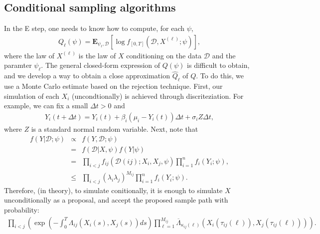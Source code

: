 \documentclass[12pt]{article}%
\begin{document}
\subsection{Conditional sampling algorithms}
In the E step, one needs to know how to compute, for each $\psi$,
\begin{eqnarray}
Q_\ell(\psi) = \mathbf E_{\psi_\ell,\mathcal D}\left[ \log f_{[0,T]}(\mathcal D, X^{(\ell)};\psi)\right],
\end{eqnarray}
where the law of $X^{(\ell)}$ is the law of $X$ conditioning on the data $\mathcal D$ and the paramter $\psi_\ell$.  The general closed-form expression of $Q(\psi)$ is difficult to obtain, and we develop a way to obtain a close approximation $\widehat{Q}_\ell$ of $Q$.  To do this, we use a Monte Carlo estimate based on the rejection technique.  First, our simulation of each $X_i$ (uncondtionally) is achieved through discriteziation.  For example, we can fix a small $\Delta t > 0$ and 
\begin{eqnarray}
Y_i(t+\Delta t) = Y_i(t) + \beta_i(\mu_i - Y_i(t)) \Delta t + \sigma_i  Z \Delta t,
\end{eqnarray}
where $Z$ is a standard normal random variable.  
Next, note that 
\begin{eqnarray}
f(Y\left|\mathcal D\right.;\psi) 
&\propto& f(Y,\mathcal D;\psi) \\
&=& f(\mathcal D\left|X,\psi\right.) f(Y\left|\psi\right.)\\
&=& \prod_{i<j} f_{ij}(\mathcal D(ij);X_i,X_j,\psi) \prod_{i=1}^n f_{i}(Y_i;\psi),\\
&\le & \prod_{i<j} (\lambda_i \lambda_j)^{M_{ij}} \prod_{i=1}^n f_{i}(Y_i;\psi).
\end{eqnarray}
Therefore, (in theory), to simulate conitionally, it is enough to simulate 
$X$ unconditionally as a proposal, and accept the proposed sample path
with probability:
\begin{eqnarray}
\prod_{i<j} \left(
\exp\left(-\int_{0}^{T} \Lambda_{ij}(X_i(s),X_j(s)) ds\right)
\prod_{\ell=1}^{M_{ij}}\overline{\Lambda}_{\kappa_{ij}(\ell)}(X_i(\tau_{ij}(\ell)),X_j(\tau_{ij}(\ell)))
\right)
. 
\end{eqnarray}
\end{document}
